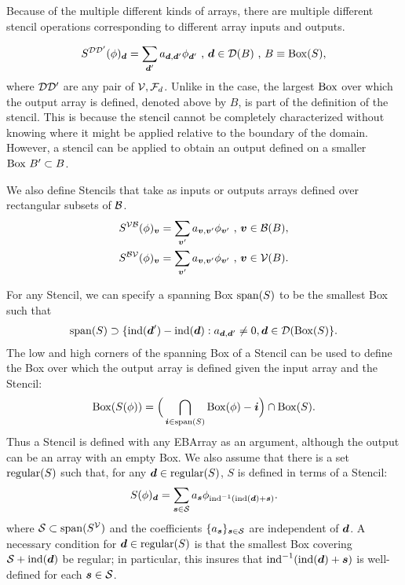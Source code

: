\documentclass[12pt]{article}
\newcommand{\ind}{{\rm{ind}}}
\newcommand{\regular}{{\rm{regular}}}
\newcommand{\spanEB}{{\rm{span}}}
\newcommand{\vof}{{\mbf{v}}}
\newcommand{\dgen}{{\mbf{d}}}
\begin{document}
Because of the multiple different kinds of arrays, there are multiple different stencil operations corresponding to different array inputs and outputs. 

\begin{gather*}
S^{\mcl{D}\mcl{D'}}(\phi)_\dgen = \sum \limits_{\dgen'} a_{\dgen,\dgen'} \phi_{\dgen'} \cma \dgen \in \mcl{D}(B) \cma
B \equiv {\rm Box}(S), \label{eqn:ebstencil}
\end{gather*}
where ${\mathcal{D}}{\mathcal{D}}'$ are any pair of ${\mathcal{V}}, {\mathcal{F}}_d$. Unlike in the  case, the largest ${\rm Box}$ over which the output array is defined, denoted above by $B$, is part of the definition of the stencil. This is because the stencil cannot be completely characterized without knowing where it might be applied relative to the boundary of the domain. However, a stencil can be applied to obtain an output defined on a smaller ${\rm Box} ~ B' \subset B$. 

We also define Stencils that take as inputs or outputs arrays defined over rectangular subsets of ${\mathcal{B}}$.
\begin{gather*}
S^{\mcl{V}\mcl{B}}(\phi)_\vof = \sum \limits_{\vof '} a_{\vof,\vof'} \phi_{\vof'} \cma \vof \in \mcl{B}(B),  \\
S^{\mcl{B}\mcl{V}}(\phi)_\vof = \sum \limits_{\vof '} a_{\vof,\vof'} \phi_{\vof'} \cma \vof \in \mcl{V}(B) .
\end{gather*}

\noindent
For any Stencil, we can specify a spanning Box $\spanEB(S)$ to be the smallest Box such that 
\begin{gather*}
\spanEB(S) \supset \{\ind(\dgen') - \ind(\dgen):a_{\dgen,\dgen'} \neq 0, \dgen \in \mcl{D}(\MBox(S)\}.
\end{gather*}
The low and high corners of the spanning Box of a Stencil can be used to define the Box over which the output array is defined given the input array and the Stencil: 
\begin{gather*}
\MBox(S(\phi)) = \Big(\bigcap \limits_{\mbf{i} \in \spanEB(S)} \MBox(\phi) - \mbf{i} \Big) \cap \MBox(S).
\end{gather*}
Thus a Stencil is defined with any EBArray as an argument, although the output can be an array with an empty Box. 
We also assume that there is a set $\regular(S)$ such that, for any $\dgen \in \regular(S)$,  $S$ is defined in terms of a  Stencil: 
\begin{gather*}
S (\phi)_\dgen = \sum \limits_{\mbf{s} \in \mcl{S}} a_{\mbf{s}} \phi_{\ind^{-1}(\ind(\dgen) + \mbf{s})}.
\end{gather*}
where $\mcl{S} \subset \spanEB(S^\mcl{V})$ and the coefficients $\{a_{\boldsymbol{s}}\}_{{\boldsymbol{s}} \in {\mathcal{S}}}$ are independent of $\dgen$. A necessary condition for $\dgen \in \regular(S)$ is that the smallest Box covering $\mcl{S} + \ind(\dgen)$ be regular; in particular, this insures that $\ind^{-1}(\ind(\dgen) + \mbf{s})$ is well-defined for each ${\boldsymbol{s}} \in {\mathcal{S}}$. 
\end{document}
